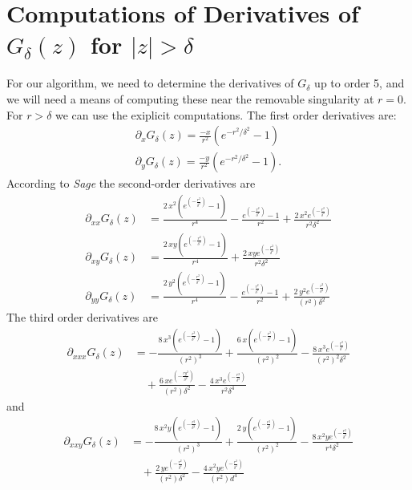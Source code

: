 \documentclass[12pt]{amsart}
\begin{document}
\section{Computations of Derivatives of $G_\delta(z)$ for $|z| > \delta$}
For our algorithm, we need to determine the 
derivatives of $G_\delta$ up to order 5,
and we will need a means of computing these near 
the removable singularity at $r=0$.
For $r > \delta$ we can use the exiplicit computations. 
The first order derivatives are:
\begin{align*}
  \partial_x G_\delta(z) = \frac{-x}{r^2}(e^{-r^2/\delta^2} - 1) \\
  \partial_y G_\delta(z) = \frac{-y}{r^2}(e^{-r^2/\delta^2} - 1).
\end{align*}
According to \emph{Sage} the second-order derivatives are
\begin{align*}
  \partial_{xx}G_\delta(z) &= \frac{2 \, x^{2} {\left(e^{\left(-\frac{r^{2}}{\delta^{2}}\right)} - 1\right)}}{r^{4}} 
  -\frac{e^{\left(-\frac{r^{2}}{\delta^{2}}\right)} - 1}{r^{2}}
  + \frac{2 \, x^{2} e^{\left(-\frac{r^{2}}{\delta^{2}}\right)}}{r^{2} \delta^{2}} \\
  \partial_{xy}G_\delta(z) &= \frac{2 \, x y {\left(e^{\left(-\frac{r^{2}}{\delta^{2}}\right)} - 1\right)}}{r^4} 
  + \frac{2 \, x y e^{\left(-\frac{r^{2}}{\delta^{2}}\right)}}{{r^{2}} \delta^{2}} \\
  \partial_{yy}G_\delta(z) &= \frac{2 \, y^{2} {\left(e^{\left(-\frac{r^{2}}{\delta^{2}}\right)} -1\right)}}{r^{4}} 
  - \frac{e^{\left(-\frac{r^{2}}{\delta^{2}}\right)} - 1}{r^{2}}
  + \frac{2 \, y^{2} e^{\left(-\frac{r^{2}}{\delta^{2}}\right)}}{{\left(r^{2}\right)} \delta^{2}} 
\end{align*}
The third order derivatives are
\begin{align*}
  \partial_{xxx}G_\delta(z) &= - \frac{8 \, x^{3} {\left(e^{\left(-\frac{r^{2}}{\delta^{2}}\right)} -1\right)}}{{\left(r^{2}\right)}^{3}} 
  + \frac{6 \, x {\left(e^{\left(-\frac{r^{2}}{\delta^{2}}\right)} - 1\right)}}{{\left(r^{2}\right)}^{2}} 
  - \frac{8 \, x^{3} e^{\left(-\frac{r^{2}}{\delta^{2}}\right)}}{{\left(r^{2}\right)}^{2} \delta^{2}} \\
  &\quad + \frac{6 \, x e^{\left(-\frac{ry^{2}}{\delta^{2}}\right)}}{{\left(r^{2}\right)} \delta^{2}} 
  - \frac{4 \, x^{3} e^{\left(-\frac{r^{2}}{\delta^{2}}\right)}}{r^2 \delta^4}
\end{align*}
and
\begin{align*}
  \partial_{xxy} G_\delta(z) &= 
  -\frac{8 \, x^{2} y {\left(e^{\left(-\frac{r^{2}}{\delta^{2}}\right)} - 1\right)}}{{\left(r^{2}\right)}^{3}} 
  + \frac{2 \, y {\left(e^{\left(-\frac{r^{2}}{\delta^{2}}\right)} - 1\right)}}{{\left(r^{2}\right)}^{2}} 
  - \frac{8 \, x^{2} y e^{\left(-\frac{r^{2}}{\delta^{2}}\right)}}{r^{4} \delta^{2}} \\
  &\quad + \frac{2 \, y e^{\left(-\frac{r^{2}}{\delta^{2}}\right)}}{{\left(r^{2}\right)} \delta^{2}} 
  - \frac{4 \, x^{2} y e^{\left(-\frac{r^{2}}{\delta^{2}}\right)}}{{\left(r^{2}\right)} d^{4}}
\end{align*}
\end{document}
